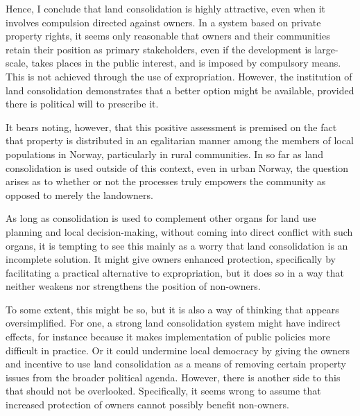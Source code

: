 Hence, I conclude that land consolidation is highly attractive, even when it involves compulsion directed against owners. In a system based on private property rights, it seems only reasonable that owners and their communities retain their position as primary stakeholders, even if the development is large-scale, takes places in the public interest, and is imposed by compulsory means. This is not achieved through the use of expropriation. However, the institution of land consolidation demonstrates that a better option might be available, provided there is political will to prescribe it. 

 
It bears noting, however, that this positive assessment is premised on the fact that property is distributed in an egalitarian manner among the members of local populations in Norway, particularly in rural communities. In so far as land consolidation is used outside of this context, even in urban Norway, the question arises as to whether or not the processes truly empowers the community as opposed to merely the landowners.

As long as consolidation is used to complement other organs for land use planning and local decision-making, without coming into direct conflict with such organs, it is tempting to see this mainly as a worry that land consolidation is an incomplete solution. It might give owners enhanced protection, specifically by facilitating a practical alternative to expropriation, but it does so in a way that neither weakens nor strengthens the position of non-owners. 

To some extent, this might be so, but it is also a way of thinking that appears oversimplified. For one, a strong land consolidation system might have indirect effects, for instance because it makes implementation of public policies more difficult in practice. Or it could undermine local democracy by giving the owners and incentive to use land consolidation as a means of removing certain property issues from the broader political agenda. However, there is another side to this that should not be overlooked. Specifically, it seems wrong to assume that increased protection of owners cannot possibly benefit non-owners. 

